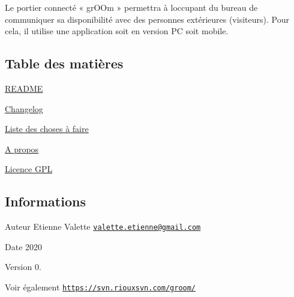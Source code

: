 Le portier connecté «​ gr\+O\+Om​ » permettra à l\textquotesingle{}occupant du bureau de communiquer sa disponibilité avec des personnes extérieures (visiteurs). Pour cela, il utilise une application soit en version PC soit mobile.\hypertarget{index_section_tdm}{}\subsection{Table des matières}\label{index_section_tdm}

\begin{DoxyItemize}
\item \hyperlink{page__r_e_a_d_m_e}{R\+E\+A\+D\+ME}
\item \hyperlink{page_changelog}{Changelog}
\item \hyperlink{todo}{Liste des choses à faire}
\item \hyperlink{page_about}{A propos}
\item \hyperlink{page_licence}{Licence G\+PL}
\end{DoxyItemize}\hypertarget{index_section_infos}{}\subsection{Informations}\label{index_section_infos}
\begin{DoxyAuthor}{Auteur}
Etienne Valette \href{mailto:valette.etienne@gmail.com}{\tt valette.\+etienne@gmail.\+com} 
\end{DoxyAuthor}
\begin{DoxyDate}{Date}
2020 
\end{DoxyDate}
\begin{DoxyVersion}{Version}
0. 
\end{DoxyVersion}
\begin{DoxySeeAlso}{Voir également}
\href{https://svn.riouxsvn.com/groom/}{\tt https\+://svn.\+riouxsvn.\+com/groom/} 
\end{DoxySeeAlso}
